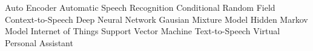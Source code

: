 


  {Auto Encoder}
 {Automatic Speech Recognition}
 {Conditional Random Field}
 {Context-to-Speech}
 {Deep Neural Network}
 {Gausian Mixture Model}
 {Hidden Markov Model}
 {Internet of Things}
 {Support Vector Machine}
 {Text-to-Speech}
 {Virtual Personal Assistant}



